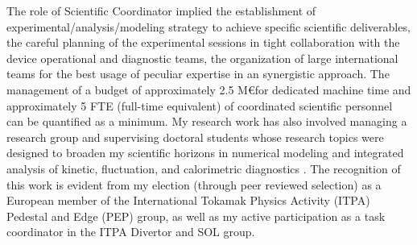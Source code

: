 The role of Scientific Coordinator implied the establishment of  experimental/analysis/modeling strategy to achieve
specific scientific deliverables,  the careful planning of the
experimental sessions in tight collaboration with the device
operational and diagnostic teams,  the organization of large
international teams for the best usage of peculiar expertise in an
synergistic approach. The management of a budget of approximately 2.5
M\euro for
dedicated machine time and approximately 5 FTE (full-time equivalent)
of coordinated scientific personnel can be quantified as a minimum. My
research work has also involved managing a research group and
supervising doctoral students whose research topics were designed to
broaden my scientific horizons in numerical modeling
\cite{Mancini:nf2023, mancini:nf2021} and integrated analysis of
kinetic, fluctuation, and calorimetric diagnostics
\cite{Redl:ppcf2023, Redl2023}. The recognition of this work is
evident from my election (through peer reviewed selection) as a
European member of the International Tokamak Physics Activity (ITPA)
Pedestal and Edge (PEP) group, as well as my active participation as a
task coordinator in the ITPA Divertor and SOL group. 

